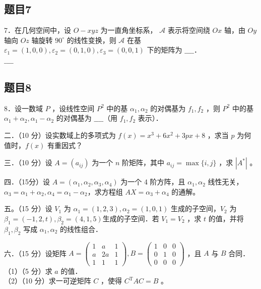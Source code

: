 \documentclass{article}
\begin{document}
\subsection{题目7}
7．在几何空间中，设 \(O-x y z\) 为一直角坐标系， \(\mathcal{A}\) 表示将空间绕 \(O x\) 轴，由 \(O y\) 轴向 \(O z\) 轴旋转 \(90^{\circ}\) 的线性变换，则 \(\mathcal{A}\) 在基 \(\varepsilon_{1}=(1,0,0), \varepsilon_{2}=(0,1,0), \varepsilon_{3}=(0,0,1)\) 下的矩阵为 \(\_\_\_\_\)．\\
\(\_\_\_\_\)

\subsection{题目8}
8．设一数域 \(P\) ，设线性空间 \(P^{2}\) 中的基 \(\alpha_{1}, \alpha_{2}\) 的对偶基为 \(f_{1}, f_{2}\) ，则 \(P^{2}\) 中的基 \(\alpha_{1}+\alpha_{2}, \alpha_{1}-\alpha_{2}\) 的对偶基为 \(\_\_\_\_\)（用 \(f_{1}, f_{2}\) 表示）．

二．（10 分）设实数域上的多项式为 \(f(x)=x^{3}+6 x^{2}+3 p x+8\) ，求当 \(p\) 为何值时，\(f(x)\) 有重因式？

三．（10 分）设 \(A=\left(a_{i j}\right)\) 为一个 \(n\) 阶矩阵，其中 \(a_{i j}=\max \{i, j\}\) ，求 \(\left|A^{*}\right|\) 。

四．（15分）设 \(A=\left(\alpha_{1}, \alpha_{2}, \alpha_{3}, \alpha_{4}\right)\) 为一个 4 阶方阵，且 \(\alpha_{1}, \alpha_{2}\) 线性无关，\(\alpha_{3}=\alpha_{1}+\alpha_{2}, \alpha_{4}=\alpha_{1}-\alpha_{2}\)，求方程组 \(A X=\alpha_{3}+\alpha_{4}\) 的通解。

五。（15 分）设 \(V_{1}\) 为 \(\alpha_{1}=(1,2,3), \alpha_{2}=(1,0,1)\) 生成的子空间，\(V_{2}\) 为 \(\beta_{1}=(-1,2, t), \beta_{2}=(4,1,5)\)生成的子空间．若 \(V_{1}=V_{2}\) ，求 \(t\) 的值，并将 \(\beta_{1}, \beta_{2}\) 写成 \(\alpha_{1}, \alpha_{2}\) 的线性组合．

六．（15 分）设矩阵 \(A=\left(\begin{array}{lll}1 & a & 1 \\ a & 2 a & 1 \\ 1 & 1 & 1\end{array}\right), B=\left(\begin{array}{lll}1 & 0 & 0 \\ 0 & 1 & 0 \\ 0 & 0 & 0\end{array}\right)\) ，且 \(A\) 与 \(B\) 合同．\\
（1）（5 分）求 \(a\) 的值．\\
（2）（10 分）求一可逆矩阵 \(C\) ，使得 \(C^{\mathrm{T}} A C=B\) 。
\end{document}

